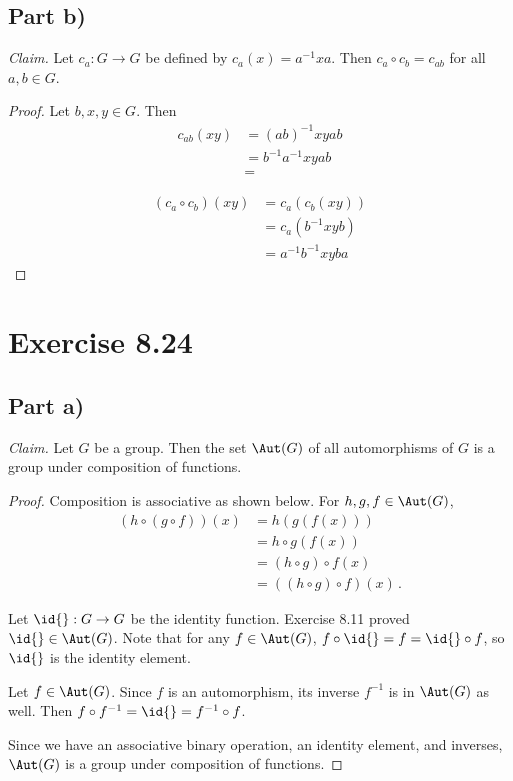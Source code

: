 \documentclass{abrice}
\newcommand{\Claim}{\emph{Claim.}\xspace}%
\begin{document}
\subsection{Part b)}

\Claim Let $c_a : G \to G$ be defined by $c_a(x) = a^{-1} x a$. Then $c_a \circ
c_b = c_{ab}$ for all $a,b \in G$.

\begin{proof}
  Let $b,x,y \in G$. Then
  \begin{align*}
    c_{ab}(xy)
    &= (ab)^{-1} xy ab \\
    &= b^{-1} a^{-1} xy ab \\
    &=
  \end{align*}

  \begin{align*}
    (c_a \circ c_b)(xy)
    &= c_a(c_b(xy)) \\
    &= c_a(b^{-1} xy b) \\
    &= a^{-1} b^{-1} xy b a
  \end{align*}
\end{proof}

\section{Exercise 8.24}

\subsection{Part a)}

\Claim Let $G$ be a group. Then the set $\Aut(G)$ of all automorphisms of $G$ is
a group under composition of functions.

\begin{proof}
  Composition is associative as shown below. For $h,g,f \in \Aut(G)$,
  \begin{align*}
    (h \circ (g \circ f))(x)
    &= h(g(f(x))) \\
    &= h \circ g(f(x)) \\
    &= (h \circ g) \circ f(x) \\
    &= ((h \circ g) \circ f) (x)\, .
  \end{align*}

  Let $\id{} : G \to G$ be the identity function. Exercise 8.11 proved $\id{} \in
  \Aut(G)$. Note that for any $f \in \Aut(G)$, $f \circ \id{} = f = \id{} \circ f$,
  so $\id{}$ is the identity element.

  Let $f \in \Aut(G)$. Since $f$ is an automorphism, its inverse $f^{-1}$ is in
  $\Aut(G)$ as well. Then $f \circ f^{-1} = \id{} = f^{-1} \circ f$.

  Since we have an associative binary operation, an identity element, and
  inverses, $\Aut(G)$ is a group under composition of functions.
\end{proof}
\end{document}
